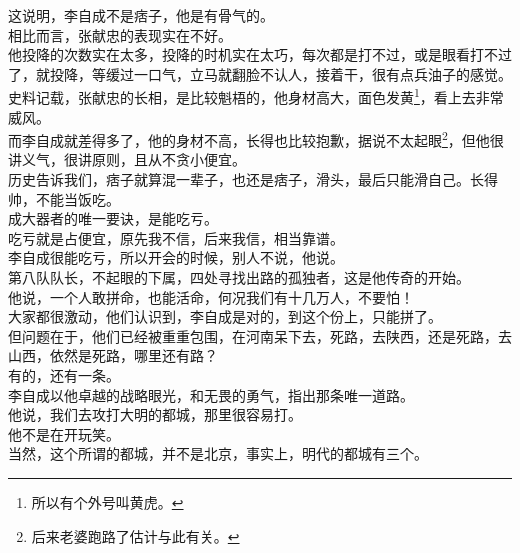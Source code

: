 \begin{multicols}{\theparacolNo}
这说明，李自成不是痞子，他是有骨气的。\\

相比而言，张献忠的表现实在不好。\\

他投降的次数实在太多，投降的时机实在太巧，每次都是打不过，或是眼看打不过了，就投降，等缓过一口气，立马就翻脸不认人，接着干，很有点兵油子的感觉。\\

史料记载，张献忠的长相，是比较魁梧的，他身材高大，面色发黄\footnote{所以有个外号叫黄虎。}，看上去非常威风。\\

而李自成就差得多了，他的身材不高，长得也比较抱歉，据说不太起眼\footnote{后来老婆跑路了估计与此有关。}，但他很讲义气，很讲原则，且从不贪小便宜。\\

历史告诉我们，痞子就算混一辈子，也还是痞子，滑头，最后只能滑自己。长得帅，不能当饭吃。\\

成大器者的唯一要诀，是能吃亏。\\

吃亏就是占便宜，原先我不信，后来我信，相当靠谱。\\

李自成很能吃亏，所以开会的时候，别人不说，他说。\\

第八队队长，不起眼的下属，四处寻找出路的孤独者，这是他传奇的开始。\\

他说，一个人敢拼命，也能活命，何况我们有十几万人，不要怕！\\

大家都很激动，他们认识到，李自成是对的，到这个份上，只能拼了。\\

但问题在于，他们已经被重重包围，在河南呆下去，死路，去陕西，还是死路，去山西，依然是死路，哪里还有路？\\

有的，还有一条。\\

李自成以他卓越的战略眼光，和无畏的勇气，指出那条唯一道路。\\

他说，我们去攻打大明的都城，那里很容易打。\\

他不是在开玩笑。\\

当然，这个所谓的都城，并不是北京，事实上，明代的都城有三个。\\


\end{multicols}

